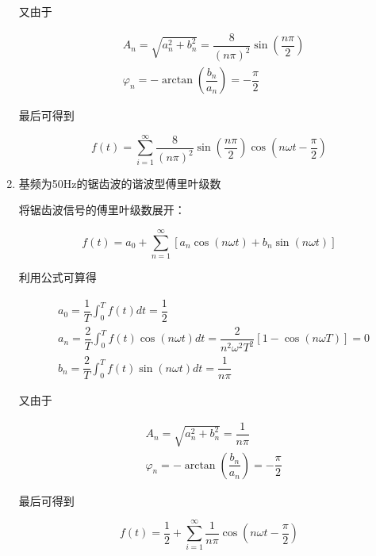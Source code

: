 \documentclass[dvipsnames, svgnames,a4paper,11pt]{article}
\begin{document}
\begin{enumerate}
  又由于

  \begin{align*}
    & A_n = \sqrt{a_n^2 + b_n^2} = \dfrac{8}{(n\pi)^2}\sin (\dfrac{n\pi}{2})\\
    & \varphi_n = -\arctan (\dfrac{b_n}{a_n}) = -\dfrac{\pi}{2}
  \end{align*}
    
  最后可得到

  \begin{equation*}
    f(t) = \sum_{i = 1}^{\infty} \dfrac{8}{(n\pi)^2}\sin (\dfrac{n\pi}{2})\cos(n\omega t - \dfrac{\pi}{2}) 
  \end{equation*}


  \item 基频为50Hz的锯齿波的谐波型傅里叶级数

  将锯齿波信号的傅里叶级数展开：

  \begin{equation*}
    f(t) = a_0 + \sum_{n = 1}^{\infty} \left [ a_n \cos (n\omega t) + b_n \sin (n\omega t) \right ]
  \end{equation*}

  利用公式可算得

  \begin{align*}
    & a_0 = \dfrac{1}{T}\int_{0}^{T}f(t)dt = \dfrac{1}{2} \\
    & a_n = \dfrac{2}{T}\int_{0}^{T}f(t)\cos (n\omega t)dt = \dfrac{2}{n^2\omega^2 T^2} [1 - \cos(n\omega T)] = 0 \\
    & b_n = \dfrac{2}{T}\int_{0}^{T}f(t)\sin (n\omega t)dt = \dfrac{1}{n\pi}
  \end{align*}
    
  又由于

  \begin{align*}
    & A_n = \sqrt{a_n^2 + b_n^2} = \dfrac{1}{n\pi}\\
    & \varphi_n = -\arctan (\dfrac{b_n}{a_n}) = -\dfrac{\pi}{2}
  \end{align*}
    
  最后可得到

  \begin{equation*}
    f(t) = \dfrac{1}{2} + \sum_{i = 1}^{\infty} \dfrac{1}{n\pi} \cos(n\omega t - \dfrac{\pi}{2})
  \end{equation*}



\end{enumerate}
\end{document}

